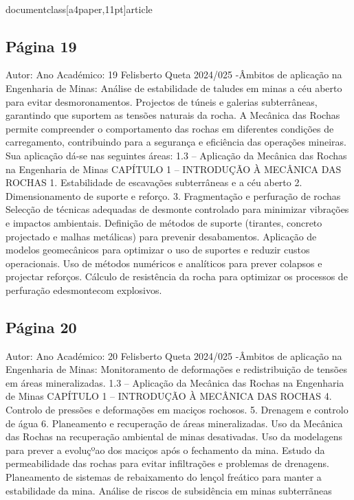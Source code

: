 \\documentclass[a4paper,11pt]{article}
\begin{document}
\subsection*{Página 19}
Autor:
Ano Académico:
19
Felisberto Queta
2024/025
-Âmbitos de aplicação na Engenharia de Minas:
Análise de estabilidade de taludes em minas a céu aberto para evitar
desmoronamentos.
Projectos de túneis e galerias subterrâneas, garantindo que suportem as 
tensões naturais da rocha.
A Mecânica das Rochas permite compreender o comportamento das rochas em diferentes condições de carregamento, 
contribuindo para a segurança e eficiência das operações mineiras. Sua aplicação dá-se nas seguintes áreas:
1.3 – Aplicação da Mecânica das Rochas na Engenharia de Minas
CAPÍTULO 1 – INTRODUÇÃO À MECÂNICA DAS ROCHAS
1. Estabilidade de escavações subterrâneas e 
a céu aberto
2. Dimensionamento de suporte e reforço.
3. Fragmentação e perfuração de rochas
Selecção de técnicas adequadas de desmonte controlado para minimizar 
vibrações e impactos ambientais.
Definição de métodos de suporte (tirantes, concreto projectado e malhas
metálicas) para prevenir desabamentos.
Aplicação de modelos geomecânicos para optimizar o uso de suportes e 
reduzir custos operacionais.
Uso de métodos numéricos e analíticos para prever colapsos e projectar
reforços.
Cálculo de resistência da rocha para optimizar os processos de 
perfuração edesmontecom explosivos.



\subsection*{Página 20}
Autor:
Ano Académico:
20
Felisberto Queta
2024/025
-Âmbitos de aplicação na Engenharia de Minas:
Monitoramento de deformações e redistribuição de tensões em áreas 
mineralizadas.
1.3 – Aplicação da Mecânica das Rochas na Engenharia de Minas
CAPÍTULO 1 – INTRODUÇÃO À MECÂNICA DAS ROCHAS
4. Controlo de pressões e deformações em 
maciços rochosos.
5. Drenagem e controlo de água
6. Planeamento e recuperação de áreas 
mineralizadas.
Uso da Mecânica das Rochas na recuperação ambiental de minas 
desativadas.
Uso da modelagens para prever a evoluçºao dos maciços após o 
fechamento da mina.
Estudo
da
permeabilidade
das
rochas
para
evitar
infiltrações
e
problemas de drenagens.
Planeamento de sistemas de rebaixamento do lençol freático para 
manter a estabilidade da mina.
Análise de riscos de subsidência em minas subterrãneas
\end{document}
